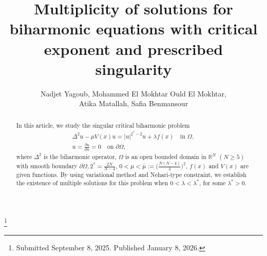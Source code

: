 \documentclass[reqno]{amsart}
\begin{document}
\title[\hfilneg EJDE-2026/02\hfil 
Multiplicity of solutions for biharmonic elliptic singular problems]
{Multiplicity of solutions for biharmonic equations with critical
exponent and prescribed singularity}

\author[N. Yagoub, M. E. O. El Mokhtar, A. Matallah, S. Benmansour \hfil EJDE-2026/02\hfilneg]
{Nadjet Yagoub, Mohammed El Mokhtar Ould El Mokhtar, \\
Atika Matallah, Safia Benmansour}

\address{Nadjet Yagoub \newline
Laboratory of Analysis and Control of Partial Differential Equations,
University of Sidi Bel Abbes, Algeria}

\address{Mohammed El Mokhtar Ould El Mokhtar \newline
Department of Mathematics,
College of Science,
Qassim University, BO 6644,
Buraidah 51452, Saudi Arabia}

\address{Atika Matallah \newline
Laboratory of Analysis and Control of Partial Differential Equations,
Higher School of Management, Tlemcen, Algeria}

\address{Safia Benmansour\newline
Laboratory of Analysis and Control of Partial Differential Equations,
Higher School of Management, Tlemcen, Algeria}

\thanks{Submitted September 8, 2025. Published January 8, 2026.}

\begin{abstract}
In this article, we study the singular critical biharmonic problem
\begin{gather*}
 \Delta^2u-\mu V(x)u=|u|^{2^*-2}u+\lambda f(x) \quad \text{in } \Omega, \\
 u= \frac{\partial u}{\partial n}=0 \quad \text{on } \partial \Omega,
\end{gather*}
where \( \Delta^2\) is the biharmonic operator, \(\Omega\) is an open bounded domain
in \(\mathbb{R}^N\) \((N \geq 5)\) with smooth boundary
\(\partial \Omega, 2^* = \frac{2N}{N-4}\), \(0 < \mu < \bar{\mu} :=
\big( \frac{N(N-4)}{4} \big)^2\), \(f(x)\) and \(V(x)\) are given functions.
By using variational method and Nehari-type constraint, we establish the existence of
multiple solutions for this problem when \(0<\lambda<\lambda^*\), for some
\(\lambda^* > 0\).
\end{abstract}
\end{document}
